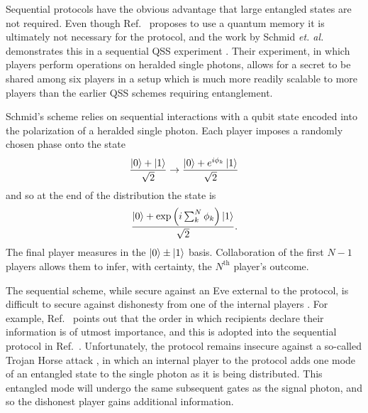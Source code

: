 Sequential protocols have the obvious advantage that large entangled states are not required. Even though Ref.~\cite{Zhang2005} proposes to use a quantum memory it is ultimately not necessary for the protocol, and the work by Schmid \emph{et. al.} demonstrates this in a sequential QSS experiment \cite{Schmid2005}. Their experiment, in which players perform operations on heralded single photons, allows for a secret to be shared among six players in a setup which is much more readily scalable to more players than the earlier QSS schemes requiring entanglement.


Schmid's scheme relies on sequential interactions with a qubit state encoded into the polarization of a heralded single photon. Each player imposes a randomly chosen phase onto the state
\begin{equation}
\frac{\ket{0} + \ket{1}}{\sqrt{2}} \rightarrow \frac{\ket{0} + e^{i \phi_k} \ket{1}}{\sqrt{2}}
\end{equation}
and so at the end of the distribution the state is
\begin{equation}
\frac{\ket{0} + \exp\left(i \sum_{k}^N \phi_k\right)\ket{1}}{\sqrt{2}}.
\end{equation}
The final player measures in the $\ket{0} \pm \ket{1}$ basis. Collaboration of the first $N-1$ players allows them to infer, with certainty, the $N^{\text{th}}$ player's outcome.



The sequential scheme, while secure against an Eve external to the protocol, is difficult to secure against dishonesty from one of the internal players \cite{Deng2005, Qin2006, He2007}. For example, Ref.~\cite{He2007} points out that the order in which recipients declare their information is of utmost importance, and this is adopted into the sequential protocol in Ref.~\cite{Schmid2007}. Unfortunately, the protocol remains insecure against a so-called Trojan Horse attack \cite{Deng2005}, in which an internal player to the protocol adds one mode of an entangled state to the single photon as it is being distributed. This entangled mode will undergo the same subsequent gates as the signal photon, and so the dishonest player gains additional information. 

